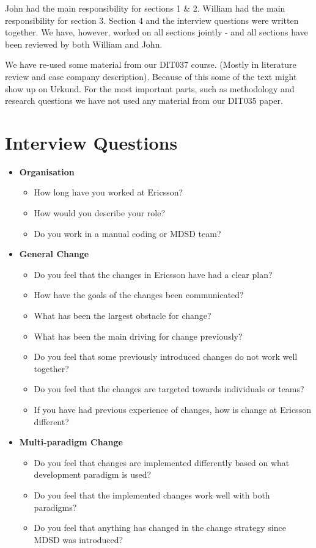 \documentclass[10pt,twocolumn]{article}
\begin{document}




John had the main responsibility for sections 1 \& 2. William had the main responsibility for section 3. Section 4 and the interview questions were written together. We have, however, worked on all sections jointly - and all sections have been reviewed by both William and John. 

We have re-used some material from our DIT037 course. (Mostly in literature review and case company description). Because of this some of the text might show up on Urkund. For the most important parts, such as methodology and research questions we have not used any material from our DIT035 paper. 

\newpage
\appendix

\section{Interview Questions}
\begin{itemize}
\item \textbf{Organisation}
\begin{itemize}
\item How long have you worked at Ericsson?
\item How would you describe your role?
\item Do you work in a manual coding or MDSD team?
\end{itemize}

\item \textbf{General Change}
\begin{itemize}
\item Do you feel that the changes in Ericsson have had a clear plan?
\item How have the goals of the changes been communicated? 
\item What has been the largest obstacle for change?
\item What has been the main driving for change previously?
\item Do you feel that some previously introduced changes do not work well together?
\item Do you feel that the changes are targeted towards individuals or teams? 
\item If you have had previous experience of changes, how is change at Ericsson different? 
\end{itemize}

\item \textbf{Multi-paradigm Change}
\begin{itemize}
\item Do you feel that changes are implemented differently based on what development paradigm is used?
\item Do you feel that the implemented changes work well with both paradigms? 
\item Do you feel that anything has changed in the change strategy since MDSD was introduced? 
\end{itemize}


\end{itemize}
\end{document}
